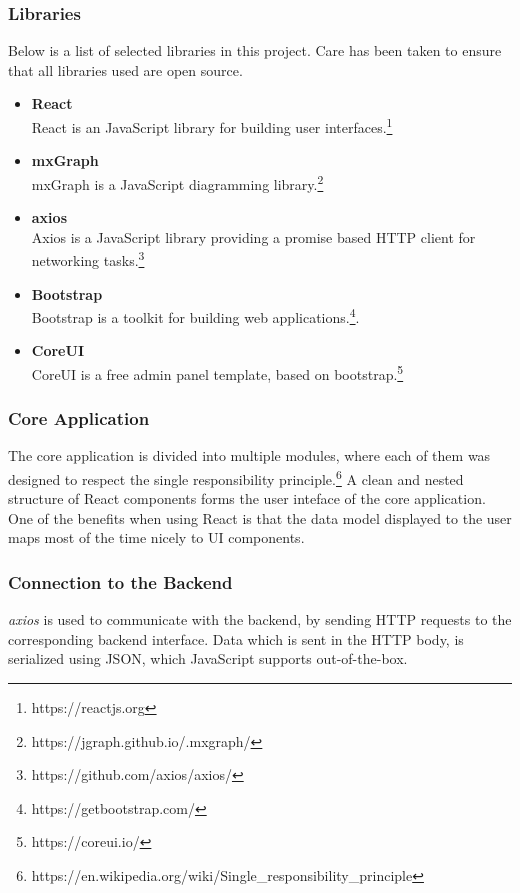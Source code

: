 \documentclass[a4paper,top=25mm,bottom=25mm,12pt,pdftex,halfparskip,twoside,bibtotoc,numbers=noenddot]{scrbook}
\begin{document}
\subsubsection{Libraries}
Below is a list of selected libraries in this project. Care has been taken to ensure that all libraries used are open source.
\begin{itemize}
\item \textbf{React}\\
React is an JavaScript library for building user interfaces.\footnote{https://reactjs.org}
\item \textbf{mxGraph}\\
mxGraph is a JavaScript diagramming library.\footnote{https://jgraph.github.io/.mxgraph/}
\item \textbf{axios}\\
Axios is a JavaScript library providing a promise based HTTP client for networking tasks.\footnote{https://github.com/axios/axios/}
\item \textbf{Bootstrap}\\
Bootstrap is a toolkit for building web applications.\footnote{https://getbootstrap.com/}.
\item \textbf{CoreUI}\\
CoreUI is a free admin panel template, based on bootstrap.\footnote{https://coreui.io/}
\end{itemize}

\subsubsection{Core Application}

The core application is divided into multiple modules, where each of them was designed to respect the single responsibility principle.\footnote{https://en.wikipedia.org/wiki/Single\_responsibility\_principle} A clean and nested structure of React components forms the user inteface of the core  application. One of the benefits when using React is that the data model displayed to the user maps most of the time nicely to UI components.

\subsubsection{Connection to the Backend}

\textit{axios} is used to communicate with the backend, by sending HTTP requests to the corresponding backend interface. Data which is sent in the HTTP body, is serialized using JSON, which JavaScript supports out-of-the-box.
\end{document}

